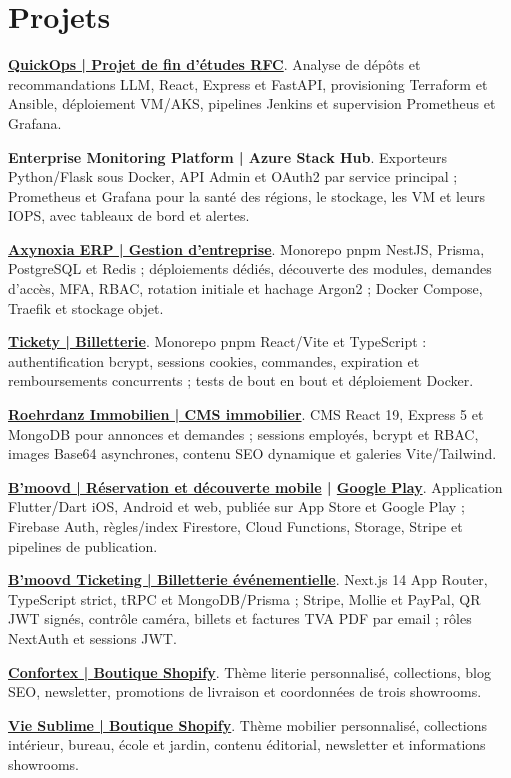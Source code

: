 \documentclass[11pt,a4paper]{article}
\newcommand{\project}[2]{\Needspace{3\baselineskip}\textbf{#1}. #2\par}
\begin{document}
\section{Projets}
\project{\href{https://github.com/tamim-hmizi/QuickOps-AI}{QuickOps | Projet de fin d’études RFC}}{Analyse de dépôts et recommandations LLM, React, Express et FastAPI, provisioning Terraform et Ansible, déploiement VM/AKS, pipelines Jenkins et supervision Prometheus et Grafana.}
\project{Enterprise Monitoring Platform | Azure Stack Hub}{Exporteurs Python/Flask sous Docker, API Admin et OAuth2 par service principal ; Prometheus et Grafana pour la santé des régions, le stockage, les VM et leurs IOPS, avec tableaux de bord et alertes.}
\project{\href{https://erp.products.axynoxia.com}{Axynoxia ERP | Gestion d’entreprise}}{Monorepo pnpm NestJS, Prisma, PostgreSQL et Redis ; déploiements dédiés, découverte des modules, demandes d’accès, MFA, RBAC, rotation initiale et hachage Argon2 ; Docker Compose, Traefik et stockage objet.}
\project{\href{https://tickets.products.axynoxia.com}{Tickety | Billetterie}}{Monorepo pnpm React/Vite et TypeScript : authentification bcrypt, sessions cookies, commandes, expiration et remboursements concurrents ; tests de bout en bout et déploiement Docker.}
\project{\href{https://rimmobilien-test.de/}{Roehrdanz Immobilien | CMS immobilier}}{CMS React 19, Express 5 et MongoDB pour annonces et demandes ; sessions employés, bcrypt et RBAC, images Base64 asynchrones, contenu SEO dynamique et galeries Vite/Tailwind.}
\project{\href{https://apps.apple.com/de/app/bmoovd/id6736364332}{B'moovd | Réservation et découverte mobile} | \href{https://play.google.com/store/apps/details?id=com.bmoovd.app}{Google Play}}{Application Flutter/Dart iOS, Android et web, publiée sur App Store et Google Play ; Firebase Auth, règles/index Firestore, Cloud Functions, Storage, Stripe et pipelines de publication.}
\project{\href{https://bmoovd-shop.com}{B'moovd Ticketing | Billetterie événementielle}}{Next.js 14 App Router, TypeScript strict, tRPC et MongoDB/Prisma ; Stripe, Mollie et PayPal, QR JWT signés, contrôle caméra, billets et factures TVA PDF par email ; rôles NextAuth et sessions JWT.}
\project{\href{https://confortex.shop/}{Confortex | Boutique Shopify}}{Thème literie personnalisé, collections, blog SEO, newsletter, promotions de livraison et coordonnées de trois showrooms.}
\project{\href{https://www.viesublime.tn/}{Vie Sublime | Boutique Shopify}}{Thème mobilier personnalisé, collections intérieur, bureau, école et jardin, contenu éditorial, newsletter et informations showrooms.}
\end{document}
